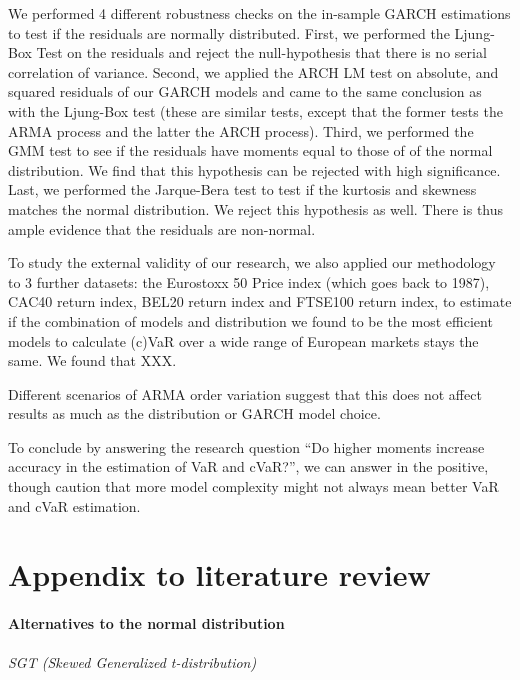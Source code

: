 \documentclass[a4paper, nobind]{templates/ociamthesis}
\begin{document}
We performed 4 different robustness checks on the in-sample GARCH estimations to test if the residuals are normally distributed. First, we performed the Ljung-Box Test on the residuals and reject the null-hypothesis that there is no serial correlation of variance. Second, we applied the ARCH LM test on absolute, and squared residuals of our GARCH models and came to the same conclusion as with the Ljung-Box test (these are similar tests, except that the former tests the ARMA process and the latter the ARCH process). Third, we performed the GMM test to see if the residuals have moments equal to those of of the normal distribution. We find that this hypothesis can be rejected with high significance. Last, we performed the Jarque-Bera test to test if the kurtosis and skewness matches the normal distribution. We reject this hypothesis as well. There is thus ample evidence that the residuals are non-normal.

To study the external validity of our research, we also applied our methodology to 3 further datasets: the Eurostoxx 50 Price index (which goes back to 1987), CAC40 return index, BEL20 return index and FTSE100 return index, to estimate if the combination of models and distribution we found to be the most efficient models to calculate (c)VaR over a wide range of European markets stays the same. We found that XXX.

Different scenarios of ARMA order variation suggest that this does not affect results as much as the distribution or GARCH model choice.

To conclude by answering the research question ``Do higher moments increase accuracy in the estimation of VaR and cVaR?'', we can answer in the positive, though caution that more model complexity might not always mean better VaR and cVaR estimation.

\startappendices

\hypertarget{appendix-to-literature-review}{%
\chapter{Appendix to literature review}\label{appendix-to-literature-review}}

\hypertarget{conditional-distributions}{%
\subsubsection{Alternatives to the normal distribution}\label{conditional-distributions}}

\hypertarget{sgtinfo}{%
\subparagraph{SGT (Skewed Generalized t-distribution)}\label{sgtinfo}}
\end{document}

